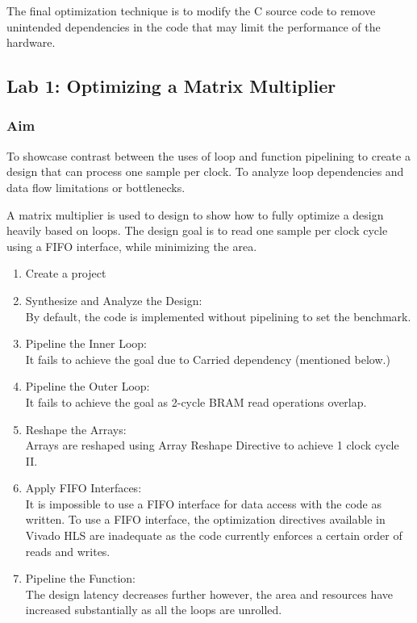 The final optimization technique is to modify the C source code to remove unintended
dependencies in the code that may limit the performance of the hardware.

\subsection{Lab 1: Optimizing a Matrix Multiplier}

\subsubsection{Aim} To showcase contrast between the uses of loop and function pipelining to create a design that can process one sample per clock. To analyze loop
dependencies and data flow limitations or bottlenecks.

\par A matrix multiplier is used to design to show how to fully optimize a design
heavily based on loops. The design goal is to read one sample per clock cycle using a FIFO interface, while minimizing the area. 

\begin{enumerate}[label=Step \arabic*:]
    \item Create a project    
    \item Synthesize and Analyze the Design:\\ 
    By default, the code is implemented without pipelining to set the benchmark.
    \item Pipeline the Inner Loop:\\
    It fails to achieve the goal due to Carried dependency (mentioned below.)
    \item Pipeline the Outer Loop:\\ It fails to achieve the goal as 2-cycle BRAM read operations overlap.
    \item Reshape the Arrays:\\ Arrays are reshaped using Array Reshape Directive to achieve 1 clock cycle II.
    \item Apply FIFO Interfaces:\\ It is impossible to use a FIFO interface for data access with the code as written. To use a FIFO interface, the optimization directives available in Vivado HLS are inadequate as the code currently enforces a certain order of reads and writes.
    \item Pipeline the Function:\\ The design latency decreases further however, the area and resources have increased substantially as all the loops are unrolled.
\end{enumerate}

